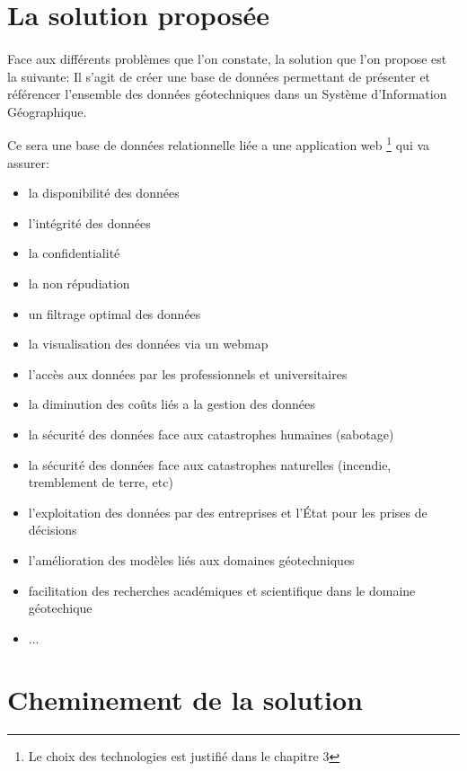     \section{La solution proposée}
        \paragraph{}
        Face aux différents problèmes que l'on constate, la solution que l'on propose est la suivante:
        Il s'agit de créer une base de données permettant de présenter et référencer l’ensemble des 
        données géotechniques dans un Système d’Information Géographique.
        \par
        Ce sera une base de données relationnelle liée a une application web
        \footnote{Le choix des technologies est justifié dans le chapitre 3} 
        qui va assurer:
        \begin{itemize}
            \item la disponibilité des données
            \item l'intégrité des données
            \item la confidentialité
            \item la non répudiation
            \item un filtrage optimal des données
            \item la visualisation des données via un webmap
            \item l'accès aux données par les professionnels et universitaires
            \item la diminution des coûts liés a la gestion des données
            \item la sécurité des données face aux catastrophes humaines (sabotage)
            \item la sécurité des données face aux catastrophes naturelles (incendie, tremblement de terre, etc)
            \item l'exploitation des données par des entreprises et l'État pour les prises de décisions
            \item l'amélioration des modèles liés aux domaines géotechniques
            \item facilitation des recherches académiques et scientifique dans le domaine géotechique
            \item ...
        \end{itemize}

    \section{Cheminement de la solution}
